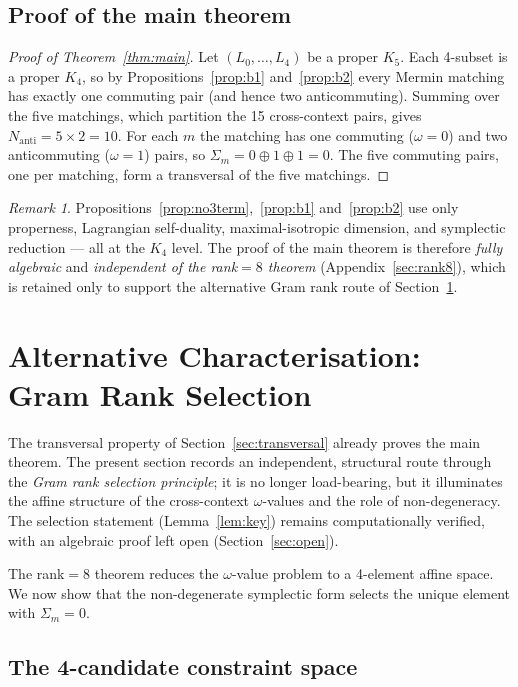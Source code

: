 \documentclass[11pt,a4paper]{article}
\theoremstyle{remark}
\newtheorem{remark}[theorem]{Remark}
\begin{document}
\subsection{Proof of the main theorem}

\begin{proof}[Proof of Theorem~\ref{thm:main}]
Let $(L_0,\ldots,L_4)$ be a proper $K_5$. Each 4-subset is a proper $K_4$, so by
Propositions~\ref{prop:b1} and~\ref{prop:b2} every Mermin matching has exactly one
commuting pair (and hence two anticommuting). Summing over the five matchings,
which partition the 15 cross-context pairs, gives $N_{\mathrm{anti}}=5\times 2=10$.
For each $m$ the matching has one commuting ($\omega=0$) and two anticommuting
($\omega=1$) pairs, so $\Sigma_m=0\oplus 1\oplus 1=0$. The five commuting pairs,
one per matching, form a transversal of the five matchings.
\end{proof}

\begin{remark}
Propositions~\ref{prop:no3term},~\ref{prop:b1} and~\ref{prop:b2} use only
properness, Lagrangian self-duality, maximal-isotropic dimension, and symplectic
reduction --- all at the $K_4$ level. The proof of the main theorem is therefore
\emph{fully algebraic} and \emph{independent of the rank$=8$ theorem}
(Appendix~\ref{sec:rank8}), which is retained only to support the alternative Gram
rank route of Section~\ref{sec:main_proof}.
\end{remark}


\section{Alternative Characterisation: Gram Rank Selection}\label{sec:main_proof}

The transversal property of Section~\ref{sec:transversal} already proves the main
theorem. The present section records an independent, structural route through the
\emph{Gram rank selection principle}; it is no longer load-bearing, but it
illuminates the affine structure of the cross-context $\omega$-values and the role
of non-degeneracy. The selection statement (Lemma~\ref{lem:key}) remains
computationally verified, with an algebraic proof left open
(Section~\ref{sec:open}).

The rank$=8$ theorem reduces the $\omega$-value problem to a 4-element
affine space.
We now show that the non-degenerate symplectic form selects the unique
element with $\Sigma_m = 0$.

\subsection{The 4-candidate constraint space}
\end{document}
